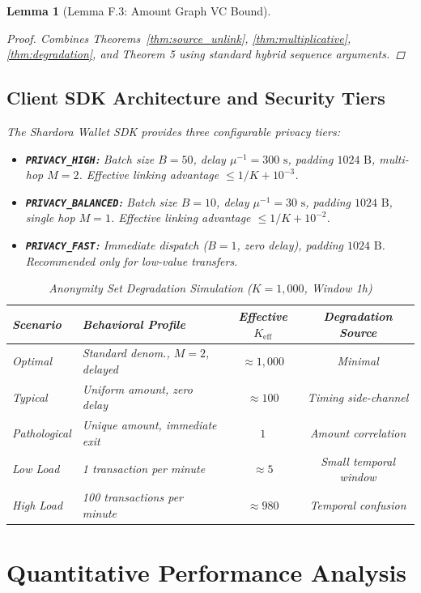 \documentclass[journal,10pt,twocolumn]{IEEEtran}
\newtheorem{lemma}[theorem]{Lemma}
\theoremstyle{definition}
\theoremstyle{remark}
\begin{document}
\begin{lemma}[Lemma F.3: Amount Graph VC Bound]
\begin{proof}
Combines Theorems~\ref{thm:source_unlink}, \ref{thm:multiplicative}, \ref{thm:degradation}, and Theorem 5 using standard hybrid sequence arguments.
\end{proof}

\subsection{Client SDK Architecture and Security Tiers}
The Shardora Wallet SDK provides three configurable privacy tiers:
\begin{itemize}[leftmargin=*]
    \item \textbf{\texttt{PRIVACY\_HIGH}:} Batch size $B=50$, delay $\mu^{-1}=300\text{ s}$, padding $1024\text{ B}$, multi-hop $M=2$. Effective linking advantage $\le 1/K + 10^{-3}$.
    \item \textbf{\texttt{PRIVACY\_BALANCED}:} Batch size $B=10$, delay $\mu^{-1}=30\text{ s}$, padding $1024\text{ B}$, single hop $M=1$. Effective linking advantage $\le 1/K + 10^{-2}$.
    \item \textbf{\texttt{PRIVACY\_FAST}:} Immediate dispatch ($B=1$, zero delay), padding $1024\text{ B}$. Recommended only for low-value transfers.
\end{itemize}

\begin{table}[h]
\centering
\caption{Anonymity Set Degradation Simulation ($K=1,000$, Window 1h)}
\label{tab:anonymity_simulation}
\small
\begin{tabularx}{\columnwidth}{lXcc}
\toprule
\textbf{Scenario} & \textbf{Behavioral Profile} & \textbf{Effective $K_{\text{eff}}$} & \textbf{Degradation Source} \\
\midrule
Optimal & Standard denom., $M=2$, delayed & $\approx 1,000$ & Minimal \\
Typical & Uniform amount, zero delay & $\approx 100$ & Timing side-channel \\
Pathological & Unique amount, immediate exit & $1$ & Amount correlation \\
Low Load & 1 transaction per minute & $\approx 5$ & Small temporal window \\
High Load & 100 transactions per minute & $\approx 980$ & Temporal confusion \\
\bottomrule
\end{tabularx}
\end{table}

\section{Quantitative Performance Analysis}


\end{lemma}
\end{document}
